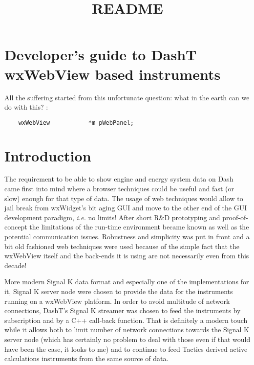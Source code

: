 \documentclass[11pt]{article}
\title{README}
\begin{document}
    
    \maketitle
    
    

    
    \hypertarget{developers-guide-to-dasht-wxwebview-based-instruments}{%
\section{Developer's guide to DashT wxWebView based
instruments}\label{developers-guide-to-dasht-wxwebview-based-instruments}}

    All the suffering started from this unfortunate question: what in the
earth can we do with this? :

\begin{verbatim}
    wxWebView           *m_pWebPanel;
\end{verbatim}

    \hypertarget{introduction}{%
\section{Introduction}\label{introduction}}

    The requirement to be able to show engine and energy system data on Dash
came first into mind where a browser techniques could be useful and fast
(or slow) enough for that type of data. The usage of web techniques
would allow to jail break from wxWidget's bit aging GUI and move to the
other end of the GUI development paradigm, \emph{i.e.} no limits! After
short R\&D prototyping and proof-of-concept the limitations of the
run-time environment became known as well as the potential communication
issues. Robustness and simplicity was put in front and a bit old
fashioned web techniques were used because of the simple fact that the
wxWebView itself and the back-ends it is using are not necessarily even
from this decade!

    More modern Signal K data format and especially one of the
implementations for it, Signal K server node were chosen to provide the
data for the instruments running on a wxWebView platform. In order to
avoid multitude of network connections, DashT's Signal K streamer was
chosen to feed the instruments by subscription and by a C++ call-back
function. That is definitely a modern touch while it allows both to
limit number of network connections towards the Signal K server node
(which has certainly no problem to deal with those even if that would
have been the case, it looks to me) and to continue to feed Tactics
derived active calculations instruments from the same source of data.
\end{document}
